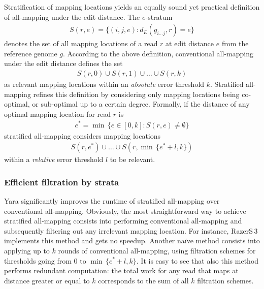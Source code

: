 Stratification of mapping locations yields an equally sound yet practical definition of all-mapping under the edit distance.
The $e$-stratum
\begin{eqnarray}
S(r,e) = \{ (i,j,e) : d_E(g_{i \dots j},r) = e\}
\end{eqnarray}
denotes the set of all mapping locations of a read $r$ at edit distance $e$ from the reference genome $g$.
According to the above definition, conventional all-mapping under the edit distance defines the set
\begin{eqnarray}
S(r,0) \cup S(r,1) \cup \dots \cup S(r,k)
\end{eqnarray}
as relevant mapping locations within an \emph{absolute} error threshold $k$.
Stratified all-mapping refines this definition by considering only mapping locations being co-optimal, or sub-optimal up to a certain degree.
Formally, if the distance of any optimal mapping location for read $r$ is
\begin{eqnarray}
e^* = \min \,\{ e \in [0,k] : S(r,e) \neq \emptyset \}
\end{eqnarray}
stratified all-mapping considers mapping locations
\begin{eqnarray}
S(r,e^*) \cup \dots \cup S(r,\min \,\{ e^*+l, k\})
\end{eqnarray}
within a \emph{relative} error threshold $l$ to be relevant.

\subsubsection{Efficient filtration by strata}

Yara significantly improves the runtime of stratified all-mapping over conventional all-mapping.
Obviously, the most straightforward way to achieve stratified all-mapping consists into performing conventional all-mapping and subsequently filtering out any irrelevant mapping location.
For instance, RazerS\,3 implements this method and gets no speedup.
Another na\"ive method consists into applying up to $k$ rounds of conventional all-mapping, using filtration schemes for thresholds going from $0$ to $\min \,\{ e^*+l, k\}$.
It is easy to see that also this method performs redundant computation: the total work for any read that maps at distance greater or equal to $k$ corresponds to the sum of all $k$ filtration schemes.

